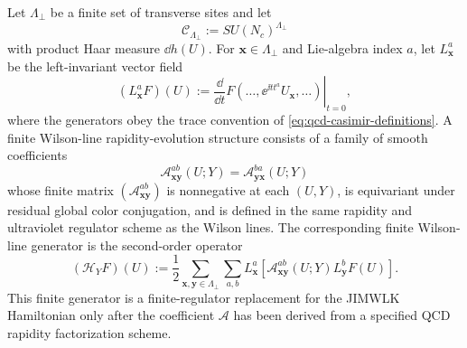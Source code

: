 \begin{definition}
\label{def:qcd-finite-wilson-line-rapidity-datum}
Let \(\Lambda_\perp\) be a finite set of transverse sites and let
\begin{equation}
  \mathcal C_{\Lambda_\perp}:=SU(N_c)^{\Lambda_\perp}
\end{equation}
with product Haar measure \(\dd h(U)\).  For
\(\mathbf x\in\Lambda_\perp\) and Lie-algebra index \(a\), let
\(L_{\mathbf x}^a\) be the left-invariant vector field
\begin{equation}
  (L_{\mathbf x}^aF)(U)
  :=
  \left.
  \frac{\dd}{\dd t}
  F(\ldots,\ee^{\ii t t^a}U_{\mathbf x},\ldots)
  \right|_{t=0},
  \label{eq:qcd-finite-wilson-left-derivative}
\end{equation}
where the generators obey the trace convention of
\eqref{eq:qcd-casimir-definitions}.  A finite Wilson-line
rapidity-evolution structure consists of a family of smooth coefficients
\[
  \mathcal A_{\mathbf x\mathbf y}^{ab}(U;Y)
  =
  \mathcal A_{\mathbf y\mathbf x}^{ba}(U;Y)
\]
whose finite matrix
\((\mathcal A_{\mathbf x\mathbf y}^{ab})\) is nonnegative at each
\((U,Y)\), is equivariant under residual global color conjugation, and is
defined in the same rapidity and ultraviolet regulator scheme as the Wilson
lines.  The corresponding finite Wilson-line generator is the
second-order operator
\begin{equation}
  (\mathcal H_YF)(U)
  :=
  \frac12
  \sum_{\mathbf x,\mathbf y\in\Lambda_\perp}
  \sum_{a,b}
  L_{\mathbf x}^a
  \left[
    \mathcal A_{\mathbf x\mathbf y}^{ab}(U;Y)
    L_{\mathbf y}^bF(U)
  \right].
  \label{eq:qcd-finite-wilson-line-generator}
\end{equation}
This finite generator is a finite-regulator replacement for the JIMWLK Hamiltonian only
after the coefficient \(\mathcal A\) has been derived from a specified QCD
rapidity factorization scheme.
\end{definition}

